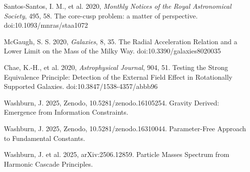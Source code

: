 \documentclass[12pt,a4paper]{article}
\begin{document}
\begin{thebibliography}{99}
 Santos-Santos, I. M., et al. 2020, \textit{Monthly Notices of the Royal Astronomical Society}, 495, 58. The core-cusp problem: a matter of perspective. doi:10.1093/mnras/staa1072

 McGaugh, S. S. 2020, \textit{Galaxies}, 8, 35. The Radial Acceleration Relation and a Lower Limit on the Mass of the Milky Way. doi:10.3390/galaxies8020035

 Chae, K.-H., et al. 2020, \textit{Astrophysical Journal}, 904, 51. Testing the Strong Equivalence Principle: Detection of the External Field Effect in Rotationally Supported Galaxies. doi:10.3847/1538-4357/abbb96


 Washburn, J. 2025, Zenodo, 10.5281/zenodo.16105254. Gravity Derived: Emergence from Information Constraints.

 Washburn, J. 2025, Zenodo, 10.5281/zenodo.16310044. Parameter-Free Approach to Fundamental Constants.

 Washburn, J. et al. 2025, arXiv:2506.12859. Particle Masses Spectrum from Harmonic Cascade Principles.

\end{thebibliography}
\end{document}
